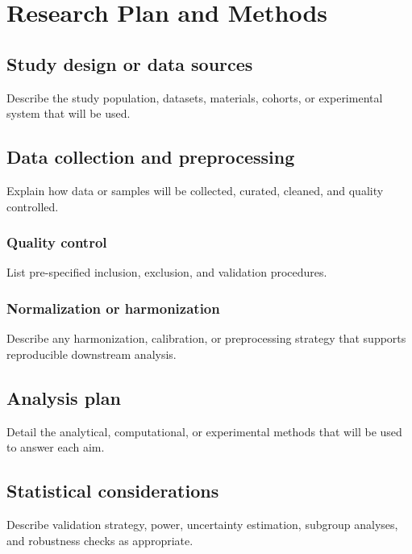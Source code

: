 \section{Research Plan and Methods}

\subsection{Study design or data sources}

Describe the study population, datasets, materials, cohorts, or
experimental system that will be used.

\subsection{Data collection and preprocessing}

Explain how data or samples will be collected, curated, cleaned, and
quality controlled.

\subsubsection{Quality control}

List pre-specified inclusion, exclusion, and validation procedures.

\subsubsection{Normalization or harmonization}

Describe any harmonization, calibration, or preprocessing strategy that
supports reproducible downstream analysis.

\subsection{Analysis plan}

Detail the analytical, computational, or experimental methods that
will be used to answer each aim.

\subsection{Statistical considerations}

Describe validation strategy, power, uncertainty estimation, subgroup
analyses, and robustness checks as appropriate.
